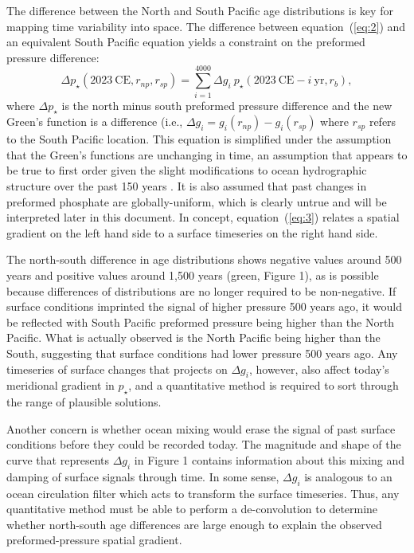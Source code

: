 \documentclass[12pt]{article}
\begin{document}
The difference between the North and South Pacific age distributions
is key for mapping time variability into space. The difference between
equation~(\ref{eq:2}) and an equivalent South Pacific equation yields
a constraint on the preformed pressure difference:
\begin{equation}
\label{eq:3}
{\Delta}p_{\star}(2023~ \mathrm{CE}, r_{np}, r_{sp}) = \sum_{i=1}^{4000} {\Delta}g_i~  p_{\star}(2023~ \mathrm{CE} - i~\mathrm{yr}, r_{b}),
\end{equation}
where ${\Delta}p_{\star}$ is the north minus south preformed pressure
difference and the new Green's function is a difference (i.e.,
${\Delta}g_i = g_{i}(r_{np}) - g_{i}(r_{sp})$ where $r_{sp}$ refers to
the South Pacific location. This equation is simplified under the
assumption that the Green's functions are unchanging in time, an
assumption that appears to be true to first order given the slight
modifications to ocean hydrographic structure over the past 150 years
\cite{Gebbie-Huybers-2019:Little}. It is also assumed that past
changes in preformed phosphate are globally-uniform, which is clearly
untrue and will be interpreted later in this document. In concept,
equation~(\ref{eq:3}) relates a spatial gradient on the left hand side
to a surface timeseries on the right hand side.

The north-south difference in age distributions shows negative values
around 500 years and positive values around 1,500 years (green, Figure
1), as is possible because differences of distributions are no longer
required to be non-negative. If surface conditions imprinted the
signal of higher pressure 500 years ago, it would be reflected with
South Pacific preformed pressure being higher than the North
Pacific. What is actually observed is the North Pacific being higher
than the South, suggesting that surface conditions had lower pressure
500 years ago. Any timeseries of surface changes that projects on
${\Delta}g_i$, however, also affect today's meridional gradient in
$p_{\star}$, and a quantitative method is required to sort through the
range of plausible solutions.

Another concern is whether ocean mixing would erase the signal of past
surface conditions before they could be recorded today. The magnitude
and shape of the curve that represents ${\Delta}g_i$ in Figure 1
contains information about this mixing and damping of surface signals
through time. In some sense, ${\Delta}g_i$ is analogous to an ocean
circulation filter which acts to transform the surface
timeseries. Thus, any quantitative method must be able to perform a
de-convolution to determine whether north-south age differences are
large enough to explain the observed preformed-pressure spatial
gradient.
\end{document}
